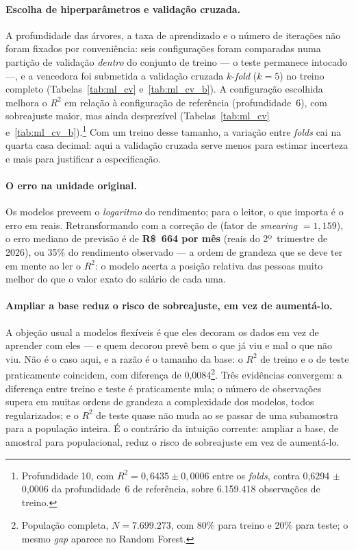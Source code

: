 \documentclass[12pt, a4paper, oneside]{article}
\begin{document}
\paragraph{Escolha de hiperparâmetros e validação cruzada.}
A profundidade das árvores, a taxa de aprendizado e o número de iterações não foram
fixados por conveniência: seis configurações foram comparadas numa partição de validação
\emph{dentro} do conjunto de treino --- o teste permanece intocado ---, e a vencedora foi
submetida a validação cruzada $k$-\emph{fold} ($k=5$) no treino completo
(Tabelas~\ref{tab:ml_cv} e~\ref{tab:ml_cv_b}). A configuração escolhida melhora o $R^2$ em relação à configuração de referência
(profundidade~6), com sobreajuste maior, mas ainda desprezível
(Tabelas~\ref{tab:ml_cv} e~\ref{tab:ml_cv_b}).\footnote{Profundidade 10, com
$R^2 = 0,6435 \pm 0,0006$ entre os \emph{folds}, contra
0,6294 $\pm$ 0,0006 da profundidade~6 de referência, sobre
6.159.418 observações de treino.} Com um treino desse tamanho, a variação entre
\emph{folds} cai na quarta casa decimal: aqui a validação cruzada serve menos para
estimar incerteza e mais para justificar a especificação.


\paragraph{O erro na unidade original.} Os modelos preveem o \emph{logaritmo} do
rendimento; para o leitor, o que importa é o erro em reais. Retransformando com a correção
de  (fator de \emph{smearing} $= 1,159$), o erro mediano de
previsão é de \textbf{R\$~664 por mês} (reais do 2º~trimestre de 2026), ou 35\% do rendimento
observado --- a ordem de grandeza que se deve ter em mente ao ler o $R^2$: o modelo acerta
a posição relativa das pessoas muito melhor do que o valor exato do salário de cada uma.

\paragraph{Ampliar a base reduz o risco de sobreajuste, em vez de aumentá-lo.}
A objeção usual a modelos flexíveis é que eles decoram os dados em vez de aprender com
eles --- e quem decorou prevê bem o que já viu e mal o que não viu. Não é o caso aqui, e
a razão é o tamanho da base: o $R^2$ de treino e o de teste praticamente coincidem, com
diferença de 0,0084\footnote{População completa, $N=7.699.273$, com 80\% para
treino e 20\% para teste; o mesmo \emph{gap} aparece no Random Forest.}. Três evidências
convergem: a diferença entre treino e teste é praticamente nula; o número de observações
supera em muitas ordens de grandeza a complexidade dos modelos, todos regularizados; e o
$R^2$ de teste quase não muda ao se passar de uma subamostra para a população inteira. É
o contrário da intuição corrente: ampliar a base, de amostral para populacional, reduz o
risco de sobreajuste em vez de aumentá-lo.
\end{document}
